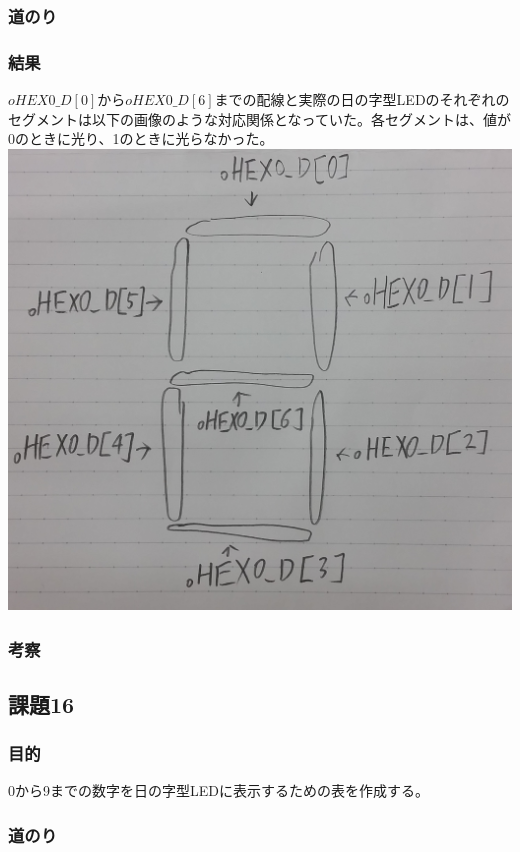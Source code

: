 \documentclass[a4paper]{jarticle}
\begin{document}
\subsubsection{道のり}
\subsubsection{結果}
$oHEX0\_D[0]$から$oHEX0\_D[6]$までの配線と実際の日の字型LEDのそれぞれのセグメントは以下の画像のような対応関係となっていた。各セグメントは、値が0のときに光り、1のときに光らなかった。\\
\includegraphics[width=15cm]{work15/SevenSegmentDisplay.jpg}
\subsubsection{考察}
\subsection{課題16}
\subsubsection{目的}
0から9までの数字を日の字型LEDに表示するための表を作成する。
\subsubsection{道のり}
\end{document}
